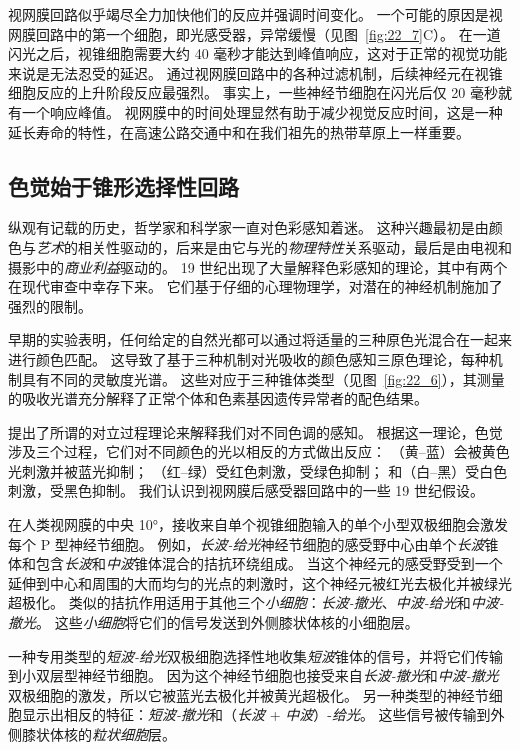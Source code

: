 视网膜回路似乎竭尽全力加快他们的反应并强调时间变化。
一个可能的原因是视网膜回路中的第一个细胞，即光感受器，异常缓慢（见图~\ref{fig:22_7}C）。
在一道闪光之后，视锥细胞需要大约 40 毫秒才能达到峰值响应，这对于正常的视觉功能来说是无法忍受的延迟。
通过视网膜回路中的各种过滤机制，后续神经元在视锥细胞反应的上升阶段反应最强烈。
事实上，一些神经节细胞在闪光后仅 20 毫秒就有一个响应峰值。
视网膜中的时间处理显然有助于减少视觉反应时间，这是一种延长寿命的特性，在高速公路交通中和在我们祖先的热带草原上一样重要。



\subsection{色觉始于锥形选择性回路}

纵观有记载的历史，哲学家和科学家一直对色彩感知着迷。
这种兴趣最初是由颜色与\textit{艺术}的相关性驱动的，后来是由它与光的\textit{物理特性}关系驱动，最后是由电视和摄影中的\textit{商业利益}驱动的。
19 世纪出现了大量解释色彩感知的理论，其中有两个在现代审查中幸存下来。
它们基于仔细的心理物理学，对潜在的神经机制施加了强烈的限制。


早期的实验表明，任何给定的自然光都可以通过将适量的三种原色光混合在一起来进行颜色匹配。
这导致了基于三种机制对光吸收的颜色感知三原色理论，每种机制具有不同的灵敏度光谱。
这些对应于三种锥体类型（见图~\ref{fig:22_6}），其测量的吸收光谱充分解释了正常个体和色素基因遗传异常者的配色结果。


提出了所谓的对立过程理论来解释我们对不同色调的感知。
根据这一理论，色觉涉及三个过程，它们对不同颜色的光以相反的方式做出反应：
（黄–蓝）会被黄色光刺激并被蓝光抑制；
（红–绿）受红色刺激，受绿色抑制；
和（白–黑）受白色刺激，受黑色抑制。
我们认识到视网膜后感受器回路中的一些 19 世纪假设。


在人类视网膜的中央 10°，接收来自单个视锥细胞输入的单个小型双极细胞会激发每个 P 型神经节细胞。
例如，\textit{长波-给光}神经节细胞的感受野中心由单个\textit{长波}锥体和包含\textit{长波}和\textit{中波}锥体混合的拮抗环绕组成。
当这个神经元的感受野受到一个延伸到中心和周围的大而均匀的光点的刺激时，这个神经元被红光去极化并被绿光超极化。
类似的拮抗作用适用于其他三个\textit{小细胞}：\textit{长波-撤光}、\textit{中波-给光}和\textit{中波-撤光}。
这些\textit{小细胞}将它们的信号发送到外侧膝状体核的小细胞层。


一种专用类型的\textit{短波-给光}双极细胞选择性地收集\textit{短波}锥体的信号，并将它们传输到小双层型神经节细胞。
因为这个神经节细胞也接受来自\textit{长波-撤光}和\textit{中波-撤光}双极细胞的激发，所以它被蓝光去极化并被黄光超极化。
另一种类型的神经节细胞显示出相反的特征：\textit{短波-撤光}和（\textit{长波} + \textit{中波}）-\textit{给光}。
这些信号被传输到外侧膝状体核的\textit{粒状细胞}层。


